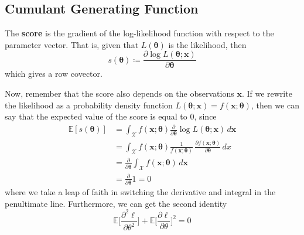     \subsection{Cumulant Generating Function}

      \begin{definition}[Score]
        \label{def:score}
      The \textbf{score} is the gradient of the log-likelihood function with respect to the parameter vector. That is, given that $L(\boldsymbol{\theta})$ is the likelihood, then 
      \begin{equation}
        s(\boldsymbol{\theta}) \coloneqq \frac{\partial \log L(\boldsymbol{\theta}; \mathbf{x})}{\partial \boldsymbol{\theta}}
      \end{equation}
      which gives a row covector. 
      \end{definition}

      Now, remember that the score also depends on the observations $\mathbf{x}$. If we rewrite the likelihood as a probability density function $L(\boldsymbol{\theta}; \mathbf{x}) = f(\mathbf{x}; \boldsymbol{\theta})$, then we can say that the expected value of the score is equal to $0$, since 
      \begin{align*}
       \mathbb{E}[s(\boldsymbol{\theta})] & = \int_\mathcal{X} f(\mathbf{x}; \boldsymbol{\theta}) \frac{\partial}{\partial \boldsymbol{\theta}} \log L (\boldsymbol{\theta}; \mathbf{x}) \,d\mathbf{x} \\
       & = \int_\mathcal{X} f(\mathbf{x}; \boldsymbol{\theta}) \frac{1}{f(\mathbf{x}; \boldsymbol{\theta})} \, \frac{\partial f(\mathbf{x}; \boldsymbol{\theta})}{\partial \boldsymbol{\theta}} \,dx \\
       & = \frac{\partial}{\partial \boldsymbol{\theta}} \int_\mathcal{X} f(\mathbf{x}; \boldsymbol{\theta}) \,d \mathbf{x} \\
       & = \frac{\partial}{\partial \boldsymbol{\theta}} 1 = 0
      \end{align*}
      where we take a leap of faith in switching the derivative and integral in the penultimate line. Furthermore, we can get the second identity 
      \begin{equation}
        \mathbb{E}\bigg[ \frac{\partial^2 \ell}{\partial \theta^2} \bigg] + \mathbb{E} \bigg[ \frac{\partial \ell}{\partial \theta} \bigg]^2 = 0
      \end{equation}


